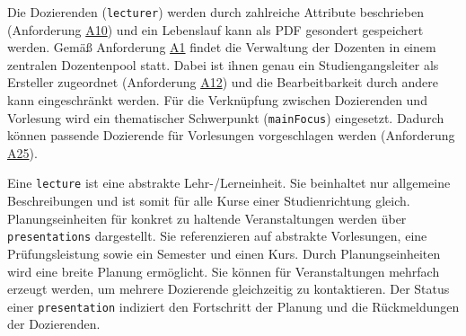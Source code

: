 Die Dozierenden (\texttt{lecturer}) werden durch zahlreiche Attribute beschrieben (Anforderung \hyperref[tab:Anforderungen]{A10}) und ein Lebenslauf kann als PDF gesondert gespeichert werden.
Gemäß Anforderung \hyperref[tab:Anforderungen]{A1} findet die Verwaltung der Dozenten in einem zentralen Dozentenpool statt.
Dabei ist ihnen genau ein Studiengangsleiter als Ersteller zugeordnet (Anforderung \hyperref[tab:Anforderungen]{A12}) und die Bearbeitbarkeit durch andere kann eingeschränkt werden. 
Für die Verknüpfung zwischen Dozierenden und Vorlesung wird ein thematischer Schwerpunkt (\texttt{mainFocus}) eingesetzt.
Dadurch können passende Dozierende für Vorlesungen vorgeschlagen werden (Anforderung \hyperref[tab:Anforderungen]{A25}).

Eine \texttt{lecture} ist eine abstrakte Lehr-/Lerneinheit.
Sie beinhaltet nur allgemeine Beschreibungen und ist somit für alle Kurse einer Studienrichtung gleich. 
Planungseinheiten für konkret zu haltende Veranstaltungen werden über \texttt{presentations} dargestellt.
Sie referenzieren auf abstrakte Vorlesungen, eine Prüfungsleistung sowie ein Semester und einen Kurs. Durch Planungseinheiten wird eine breite Planung ermöglicht.
Sie können für Veranstaltungen mehrfach erzeugt werden, um mehrere Dozierende gleichzeitig zu kontaktieren.
Der Status einer \texttt{presentation} indiziert den Fortschritt der Planung und die Rückmeldungen der Dozierenden.

